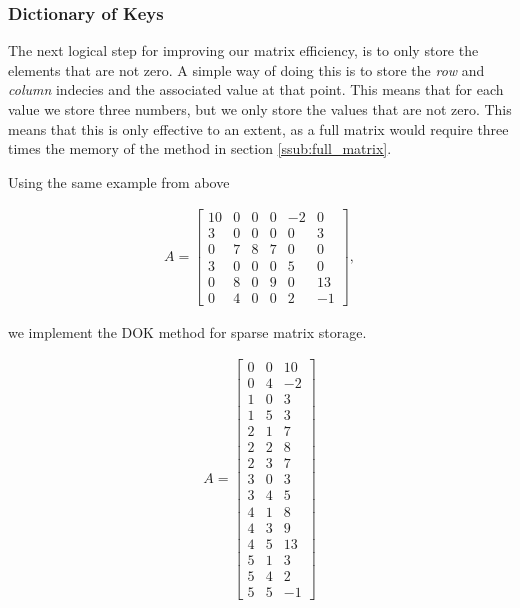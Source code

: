 \documentclass[../fem.tex]{subfiles}
\begin{document}
\subsubsection{Dictionary of Keys}%
\label{ssub:dictionary_of_keys}

The next logical step for improving our matrix efficiency, is to only store the
elements that are not zero. A simple way of doing this is to store the
\textit{row} and \textit{column} indecies and the associated value at that
point. This means that for each value we store three numbers, but we only store
the values that are not zero. This means that this is only effective to an
extent, as a full matrix would require three times the memory of the method in
section \ref{ssub:full_matrix}.

Using the same example from above

\begin{align*}
   A = \begin{bmatrix}
     10 & 0 & 0 & 0 & -2 & 0 \\
     3 & 0 & 0 & 0 & 0 & 3 \\
     0 & 7 & 8 & 7 & 0 & 0 \\
     3 & 0 & 0 & 0 & 5 & 0 \\
     0 & 8 & 0 & 9 & 0 & 13 \\
     0 & 4 & 0 & 0 & 2 & -1
   \end{bmatrix},
\end{align*}

we implement the DOK method for sparse matrix storage.

\begin{align*}
  A = \begin{bmatrix}
    0 & 0 & 10 \\
    0 & 4 & -2 \\
    1 & 0 & 3 \\
    1 & 5 & 3 \\
    2 & 1 & 7 \\
    2 & 2 & 8 \\
    2 & 3 & 7 \\
    3 & 0 & 3 \\
    3 & 4 & 5 \\
    4 & 1 & 8 \\
    4 & 3 & 9 \\
    4 & 5 & 13 \\
    5 & 1 & 3 \\
    5 & 4 & 2 \\
    5 & 5 & -1
  \end{bmatrix}
\end{align*}
\end{document}

